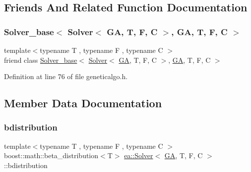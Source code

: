 \subsection{Friends And Related Function Documentation}
\mbox{\label{classea_1_1_solver_3_01_g_a_00_01_t_00_01_f_00_01_c_01_4_a36e0662bcb575fd6a11cec4eedf85117}} 
\subsubsection{\texorpdfstring{Solver\+\_\+base$<$ Solver$<$ G\+A, T, F, C $>$, G\+A, T, F, C $>$}{Solver\_base< Solver< GA, T, F, C >, GA, T, F, C >}}
{\footnotesize\ttfamily template$<$typename T , typename F , typename C $>$ \\
friend class \hyperlink{classea_1_1_solver__base}{Solver\+\_\+base}$<$ \hyperlink{classea_1_1_solver}{Solver}$<$ \hyperlink{structea_1_1_g_a}{GA}, T, F, C $>$, \hyperlink{structea_1_1_g_a}{GA}, T, F, C $>$\hspace{0.3cm}{\ttfamily [friend]}}



Definition at line 76 of file geneticalgo.\+h.



\subsection{Member Data Documentation}
\mbox{\label{classea_1_1_solver_3_01_g_a_00_01_t_00_01_f_00_01_c_01_4_a01dbd57c74c1ebd73e4ac976e29ecb33}} 
\subsubsection{\texorpdfstring{bdistribution}{bdistribution}}
{\footnotesize\ttfamily template$<$typename T , typename F , typename C $>$ \\
boost\+::math\+::beta\+\_\+distribution$<$T$>$ \hyperlink{classea_1_1_solver}{ea\+::\+Solver}$<$ \hyperlink{structea_1_1_g_a}{GA}, T, F, C $>$\+::bdistribution\hspace{0.3cm}{\ttfamily [private]}}



